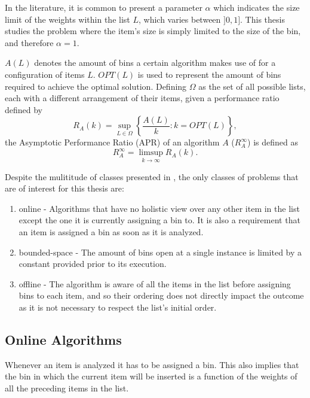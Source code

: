 In the literature, it is common to present a parameter $\alpha$ which
indicates the size limit of the weights within the list $L$, which varies
between $]0, 1]$. This thesis studies the problem where the item's size is
simply limited to the size of the bin, and therefore $\alpha = 1$.

$A(L)$ denotes the amount of bins a certain algorithm makes use of for a
configuration of items $L$. $OPT(L)$ is used to represent the amount of bins
required to achieve the optimal solution. Defining $\Omega$ as the set of all
possible lists, each with a different arrangement of their items, given a
performance ratio defined by 
\begin{equation}
    R_A (k) = \sup_{L \in \Omega} \left \{ \frac{A(L)}{k} : k = OPT(L) \right \},
\end{equation}
the Asymptotic Performance Ratio (APR) of an algorithm $A$ ($R_A^\infty$) is
defined as
\begin{equation}
    R_A^\infty = \limsup_{k \to \infty} R_A(k).
\end{equation}

Despite the mulititude of classes presented in \cite{coffman2013bin}, the only
classes of problems that are of interest for this thesis are: 
\begin{enumerate}
    \item online - Algorithms that have no holistic view over any other item in
        the list except the one it is currently assigning a bin to. It is also a
        requirement that an item is assigned a bin as soon as it is analyzed.
    \item bounded-space - The amount of bins open at a single instance is
        limited by a constant provided prior to its execution.
    \item offline - The algorithm is aware of all the items in the list before
        assigning bins to each item, and so their ordering does not directly
        impact the outcome as it is not necessary to respect the list's initial
        order.
\end{enumerate}

\subsection{Online Algorithms}

Whenever an item is analyzed it has to be assigned a bin. This also implies that
the bin in which the current item will be inserted is a function of the weights
of all the preceding items in the list.

